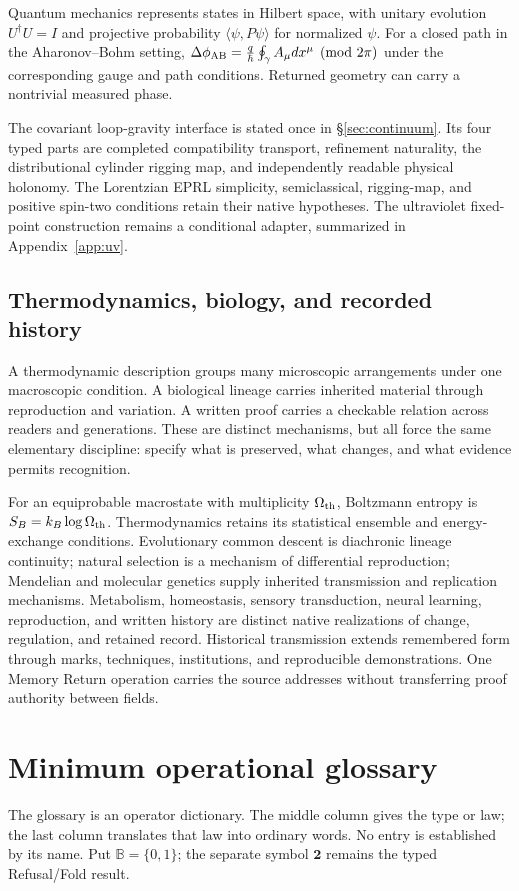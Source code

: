 \documentclass[10pt]{article}
\begin{document}
Quantum mechanics represents states in Hilbert space, with unitary evolution $U^\dagger U=I$ and projective probability $\langle\psi,P\psi\rangle$ for normalized $\psi$. For a closed path in the Aharonov--Bohm setting, $\Delta\phi_{\rm AB}=\frac q\hbar\oint_\gamma A_\mu dx^\mu\pmod{2\pi}$ under the corresponding gauge and path conditions. Returned geometry can carry a nontrivial measured phase.

The covariant loop-gravity interface is stated once in
\S\ref{sec:continuum}. Its four typed parts are completed compatibility
transport, refinement naturality, the distributional cylinder rigging map,
and independently readable physical holonomy. The Lorentzian EPRL simplicity,
semiclassical, rigging-map, and positive spin-two conditions retain their
native hypotheses. The ultraviolet fixed-point construction remains a
conditional adapter, summarized in Appendix~\ref{app:uv}.

\subsection*{Thermodynamics, biology, and recorded history}
A thermodynamic description groups many microscopic arrangements under one macroscopic condition. A biological lineage carries inherited material through reproduction and variation. A written proof carries a checkable relation across readers and generations. These are distinct mechanisms, but all force the same elementary discipline: specify what is preserved, what changes, and what evidence permits recognition.


For an equiprobable macrostate with multiplicity $\Omega_{\rm th}$, Boltzmann entropy is $S_B=k_B\log\Omega_{\rm th}$. Thermodynamics retains its statistical ensemble and energy-exchange conditions. Evolutionary common descent is diachronic lineage continuity; natural selection is a mechanism of differential reproduction; Mendelian and molecular genetics supply inherited transmission and replication mechanisms. Metabolism, homeostasis, sensory transduction, neural learning, reproduction, and written history are distinct native realizations of change, regulation, and retained record. Historical transmission extends remembered form through marks, techniques, institutions, and reproducible demonstrations. One Memory Return operation carries the source addresses without transferring proof authority between fields.

\section{Minimum operational glossary}
The glossary is an operator dictionary. The middle column gives the
type or law; the last column translates that law into ordinary words.
No entry is established by its name. Put $\mathbb B=\{0,1\}$; the
separate symbol $\mathbf2$ remains the typed Refusal/Fold result.
\end{document}
